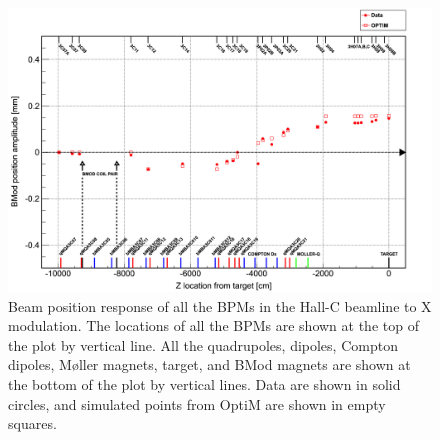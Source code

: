\begin{singlespace}
\begin{figure}[!h]
	\begin{center}
	\includegraphics[width=15.0cm]{figures/BModOpticsX}
	\end{center}
	\caption
	{Beam position response of all the BPMs in the Hall-C beamline to X modulation. The locations of all the BPMs are shown at the top of the plot by vertical line. All the quadrupoles, dipoles, Compton dipoles, M{\o}ller magnets, target, and BMod magnets are shown at the bottom of the plot by vertical lines. Data are shown in solid circles, and simulated points from OptiM are shown in empty squares.}
	\label{fig:BModOpticsX}
\end{figure}
\end{singlespace}



